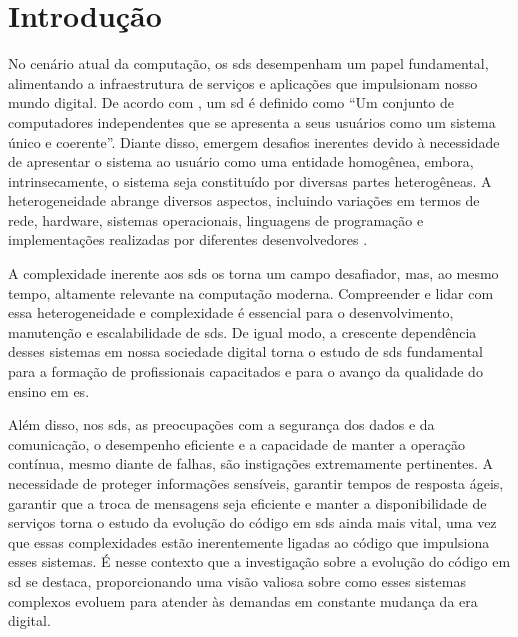 
\chapter{Introdução}\label{cap:introducao}
No cenário atual da computação, os \gls{sds} desempenham um papel fundamental, alimentando a infraestrutura de serviços e aplicações que impulsionam nosso mundo digital. De acordo com , um \gls{sd} é definido como ``Um conjunto de computadores independentes que se apresenta a seus usuários como um sistema único e coerente''. Diante disso, emergem desafios inerentes devido à necessidade de apresentar o sistema ao usuário como uma entidade homogênea, embora, intrinsecamente, o sistema seja constituído por diversas partes heterogêneas. A heterogeneidade abrange diversos aspectos, incluindo variações em termos de rede, hardware, sistemas operacionais, linguagens de programação e implementações realizadas por diferentes desenvolvedores \cite{DistributedSystemsCoulouris}.

A complexidade inerente aos \gls{sds} os torna um campo desafiador, mas, ao mesmo tempo, altamente relevante na computação moderna. Compreender e lidar com essa heterogeneidade e complexidade é essencial para o desenvolvimento, manutenção e escalabilidade de \gls{sds}. De igual modo, a crescente dependência desses sistemas em nossa sociedade digital torna o estudo de \gls{sds} fundamental para a formação de profissionais capacitados e para o avanço da qualidade do ensino em \gls{es}.

Além disso, nos \gls{sds}, as preocupações com a segurança dos dados e da comunicação, o desempenho eficiente e a capacidade de manter a operação contínua, mesmo diante de falhas, são instigações extremamente pertinentes. A necessidade de proteger informações sensíveis, garantir tempos de resposta ágeis, garantir que a troca de mensagens seja eficiente e manter a disponibilidade de serviços torna o estudo da evolução do código em \gls{sds} ainda mais vital, uma vez que essas complexidades estão inerentemente ligadas ao código que impulsiona esses sistemas. É nesse contexto que a investigação sobre a evolução do código em \gls{sd} se destaca, proporcionando uma visão valiosa sobre como esses sistemas complexos evoluem para atender às demandas em constante mudança da era digital.

